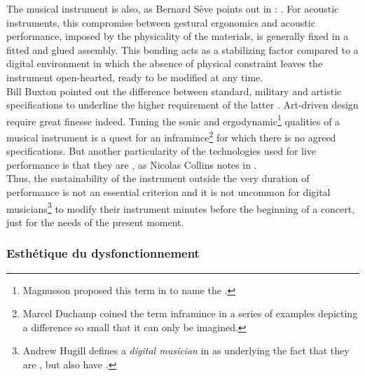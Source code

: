 The musical instrument is also, as Bernard Sève points out in \cite{seve_instrument_2013}: . For acoustic instruments, this compromise between gestural ergonomics and acoustic performance, imposed by the physicality of the materials, is generally fixed in a fitted and glued assembly. This bonding acts as a stabilizing factor compared to a digital environment in which the absence of physical constraint leaves the instrument open-hearted, ready to be modified at any time.\\
\indent Bill Buxton pointed out the difference between standard, military and artistic specifications to underline the higher requirement of the latter \cite{buxton_artists_1997}. Art-driven design require great finesse indeed. Tuning the sonic and ergodynamic\footnote{Magnusson proposed this term in \cite{magnusson_ergodynamics_2019} to name the .} qualities of a musical instrument is a quest for an inframince\footnote{Marcel Duchamp \cite{duchamp_notes_2008} coined the term inframince in a series of examples depicting a difference so small that it can only be imagined.} for which there is no agreed specifications. But another particularity of the technologies used for live performance is that they are , as Nicolas Collins notes in \cite{collins_semiconducting_2013}.\\
\indent Thus, the sustainability of the instrument outside the very duration of performance is not an essential criterion and it is not uncommon for digital musicians\footnote{Andrew Hugill defines a \textit{digital musician} in \cite{hugill_digital_2019} as  underlying the fact that they are , but also have  .} to modify their instrument minutes before the beginning of a concert, just for the needs of the present moment.
	
\subsubsection{Esthétique du dysfonctionnement}

